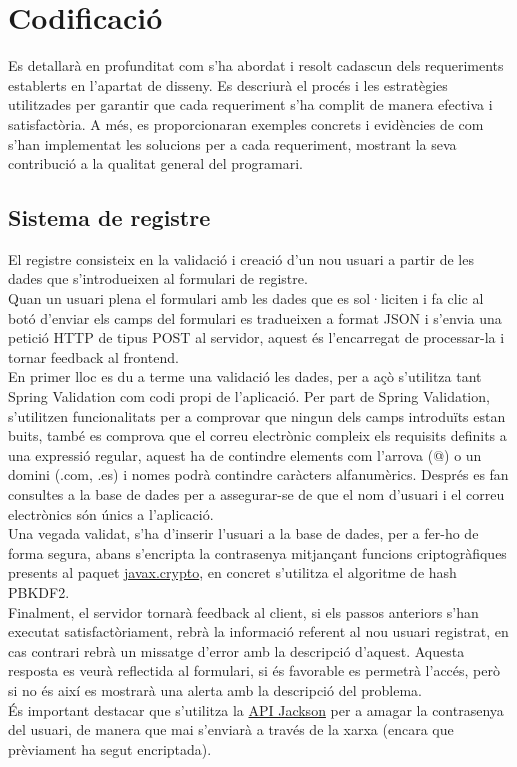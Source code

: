 \section{Codificació}
Es detallarà en profunditat com s'ha abordat i resolt cadascun dels requeriments establerts en l'apartat de disseny. Es descriurà el procés i les estratègies utilitzades per garantir que cada requeriment s'ha complit de manera efectiva i satisfactòria. A més, es proporcionaran exemples concrets i evidències de com s'han implementat les solucions per a cada requeriment, mostrant la seva contribució a la qualitat general del programari.
\subsection{Sistema de registre}
El registre consisteix en la validació i creació d'un nou usuari a partir de les dades que s'introdueixen al formulari de registre.
\\[3mm]
Quan un usuari plena el formulari amb les dades que es sol·liciten i fa clic al botó d'enviar els camps del formulari es tradueixen a format JSON i s'envia una petició HTTP de tipus POST al servidor, aquest és l'encarregat de processar-la i tornar feedback al frontend.
\\[3mm]
En primer lloc es du a terme una validació les dades, per a açò s'utilitza tant Spring Validation com codi propi de l'aplicació. Per part de Spring Validation, s'utilitzen funcionalitats per a comprovar que ningun dels camps introduïts estan buits, també es comprova que el correu electrònic compleix els requisits definits a una expressió regular, aquest ha de contindre elements com l'arrova (@) o un domini (.com, .es) i nomes podrà contindre caràcters alfanumèrics. Després es fan consultes a la base de dades per a assegurar-se de que el nom d'usuari i el correu electrònics són únics a l'aplicació.
\\[3mm]
Una vegada validat, s'ha d'inserir l'usuari a la base de dades, per a fer-ho de forma segura, abans s'encripta la contrasenya mitjançant funcions criptogràfiques presents al paquet \href{https://docs.oracle.com/javase/7/docs/api/javax/crypto/package-summary.html}{javax.crypto}, en concret s'utilitza el algoritme de hash PBKDF2.
\\[3mm]
Finalment, el servidor tornarà feedback al client, si els passos anteriors s'han executat satisfactòriament, rebrà la informació referent al nou usuari registrat, en cas contrari rebrà un missatge d'error amb la descripció d'aquest. Aquesta resposta es veurà reflectida al formulari, si és favorable es permetrà l'accés, però si no és així es mostrarà una alerta amb la descripció del problema.
\\[3mm]
És important destacar que s'utilitza la \href{https://github.com/FasterXML/jackson}{API Jackson} per a amagar la contrasenya del usuari, de manera que mai s'enviarà a través de la xarxa (encara que prèviament ha segut encriptada).
